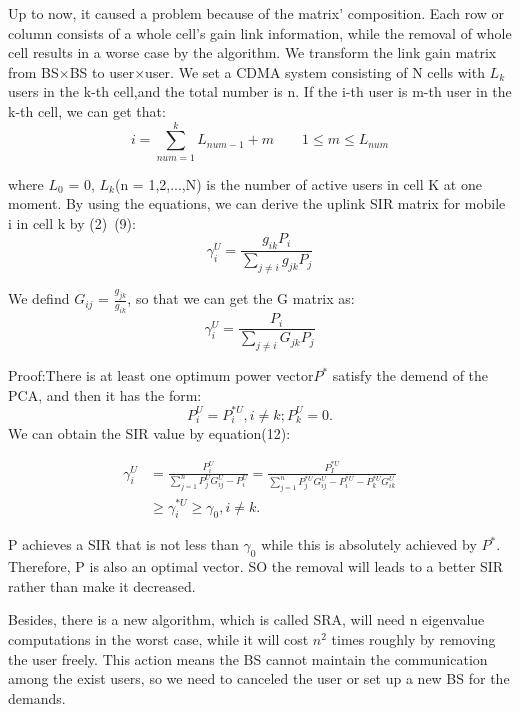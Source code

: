 \documentclass[conference]{IEEEtran}
\begin{document}
\vspace*{3mm}
Up to now, it caused a problem because of the matrix' composition. Each row or column consists of a whole cell's gain link information, while the removal of whole cell results in a worse case by the algorithm. We transform the link gain matrix from BS$\times $BS to user$\times$user. We set a CDMA system consisting of N cells with $L_k$ users in the k-th cell,and the total number is n. If the i-th user is m-th user in the k-th cell, we can get that:
\begin{equation}
i=\sum^k_{num=1}L_{num-1}+m \qquad 1\leq m\leq L_{num}
\end{equation}  

where $L_0$ = 0, $L_k$(n = 1,2,...,N) is the number of active users in cell K at one moment. By using the equations, we can derive the uplink SIR matrix for mobile i in cell k by (2)~(9):
\begin{equation}
\gamma_i^U = \frac{g_{ik}P_i}{ \sum\limits_{j\neq i}g_{jk}P_j}
\end{equation}

We defind $G_{ij}$ = $\frac{g_{jk}}{g_{ik}}$, so that we can get the G matrix as:
\begin{equation}
\gamma_i^U = \frac{P_i}{ \sum\limits_{j\neq i}G_{jk}P_j}
\end{equation}

Proof:There is at least one optimum power vector$ P^*$ satisfy the demend of the PCA, and then it has the form:
\begin{equation*}
P_i^{U} = P_i^{*U}, i \neq k; P_k^U=0.
\end{equation*}
We can obtain the SIR value by equation(12):

\begin{align*}
\gamma_i^U &= \frac{P_i^U}{\sum\limits_{j=1}^{n}P_j^UG^U_{ij}-P^U_i} =\frac{P_I^{*U}}{\sum\limits_{j=1}^{n}P_j^{*U}G^U_{ij}-P^{*U}_i-P^{*U}_kG^U_{ik}}	\\
&\geq \gamma_i^{*U}\geq \gamma_0, i \neq k.
\end{align*}	

P achieves a SIR that is not less than $\gamma_0$ while this is absolutely  achieved by $P^*$. Therefore, P is also an optimal vector. SO the removal will leads to a better SIR rather than make it decreased. 

Besides, there is a new algorithm, which is called SRA, will need n eigenvalue computations in the worst case, while it will cost $n^2$ times roughly by removing the user freely. This action means the BS cannot maintain the communication among the exist users, so we need to canceled the user or set up a new BS for the demands.
\end{document}
